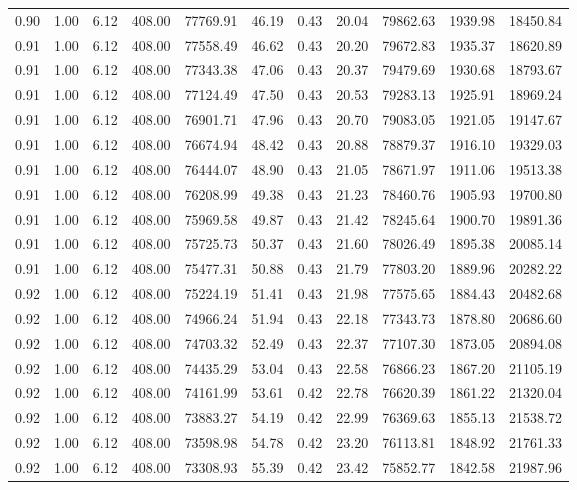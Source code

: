 \begin{table}[!ht]
\begin{tabular}{rrrrrrrrrrr}
0.90 & 1.00 & 6.12 & 408.00 & 77769.91 & 46.19 & 0.43 & 20.04 & 79862.63 & 1939.98 & 18450.84 \\
0.91 & 1.00 & 6.12 & 408.00 & 77558.49 & 46.62 & 0.43 & 20.20 & 79672.83 & 1935.37 & 18620.89 \\
0.91 & 1.00 & 6.12 & 408.00 & 77343.38 & 47.06 & 0.43 & 20.37 & 79479.69 & 1930.68 & 18793.67 \\
0.91 & 1.00 & 6.12 & 408.00 & 77124.49 & 47.50 & 0.43 & 20.53 & 79283.13 & 1925.91 & 18969.24 \\
0.91 & 1.00 & 6.12 & 408.00 & 76901.71 & 47.96 & 0.43 & 20.70 & 79083.05 & 1921.05 & 19147.67 \\
0.91 & 1.00 & 6.12 & 408.00 & 76674.94 & 48.42 & 0.43 & 20.88 & 78879.37 & 1916.10 & 19329.03 \\
0.91 & 1.00 & 6.12 & 408.00 & 76444.07 & 48.90 & 0.43 & 21.05 & 78671.97 & 1911.06 & 19513.38 \\
0.91 & 1.00 & 6.12 & 408.00 & 76208.99 & 49.38 & 0.43 & 21.23 & 78460.76 & 1905.93 & 19700.80 \\
0.91 & 1.00 & 6.12 & 408.00 & 75969.58 & 49.87 & 0.43 & 21.42 & 78245.64 & 1900.70 & 19891.36 \\
0.91 & 1.00 & 6.12 & 408.00 & 75725.73 & 50.37 & 0.43 & 21.60 & 78026.49 & 1895.38 & 20085.14 \\
0.91 & 1.00 & 6.12 & 408.00 & 75477.31 & 50.88 & 0.43 & 21.79 & 77803.20 & 1889.96 & 20282.22 \\
0.92 & 1.00 & 6.12 & 408.00 & 75224.19 & 51.41 & 0.43 & 21.98 & 77575.65 & 1884.43 & 20482.68 \\
0.92 & 1.00 & 6.12 & 408.00 & 74966.24 & 51.94 & 0.43 & 22.18 & 77343.73 & 1878.80 & 20686.60 \\
0.92 & 1.00 & 6.12 & 408.00 & 74703.32 & 52.49 & 0.43 & 22.37 & 77107.30 & 1873.05 & 20894.08 \\
0.92 & 1.00 & 6.12 & 408.00 & 74435.29 & 53.04 & 0.43 & 22.58 & 76866.23 & 1867.20 & 21105.19 \\
0.92 & 1.00 & 6.12 & 408.00 & 74161.99 & 53.61 & 0.42 & 22.78 & 76620.39 & 1861.22 & 21320.04 \\
0.92 & 1.00 & 6.12 & 408.00 & 73883.27 & 54.19 & 0.42 & 22.99 & 76369.63 & 1855.13 & 21538.72 \\
0.92 & 1.00 & 6.12 & 408.00 & 73598.98 & 54.78 & 0.42 & 23.20 & 76113.81 & 1848.92 & 21761.33 \\
0.92 & 1.00 & 6.12 & 408.00 & 73308.93 & 55.39 & 0.42 & 23.42 & 75852.77 & 1842.58 & 21987.96 \\

\end{tabular}
\end{table}
